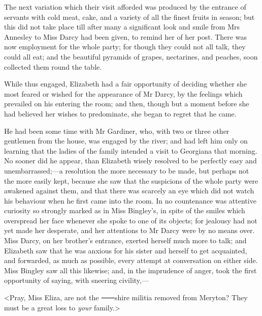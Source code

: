 The next variation which their visit afforded was produced by the entrance of servants with cold meat, cake, and a variety of all the finest fruits in season; but this did not take place till after many a significant look and smile from Mrs Annesley to Miss Darcy had been given, to remind her of her post. There was now employment for the whole party; for though they could not all talk, they could all eat; and the beautiful pyramids of grapes, nectarines, and peaches, soon collected them round the table.

While thus engaged, Elizabeth had a fair opportunity of deciding whether she most feared or wished for the appearance of Mr Darcy, by the feelings which prevailed on his entering the room; and then, though but a moment before she had believed her wishes to predominate, she began to regret that he came.

He had been some time with Mr Gardiner, who, with two or three other gentlemen from the house, was engaged by the river; and had left him only on learning that the ladies of the family intended a visit to Georgiana that morning. No sooner did he appear, than Elizabeth wisely resolved to be perfectly easy and unembarrassed;—a resolution the more necessary to be made, but perhaps not the more easily kept, because she saw that the suspicions of the whole party were awakened against them, and that there was scarcely an eye which did not watch his behaviour when he first came into the room. In no countenance was attentive curiosity so strongly marked as in Miss Bingley's, in spite of the smiles which overspread her face whenever she spoke to one of its objects; for jealousy had not yet made her desperate, and her attentions to Mr Darcy were by no means over. Miss Darcy, on her brother's entrance, exerted herself much more to talk; and Elizabeth saw that he was anxious for his sister and herself to get acquainted, and forwarded, as much as possible, every attempt at conversation on either side. Miss Bingley saw all this likewise; and, in the imprudence of anger, took the first opportunity of saying, with sneering civility,—

<Pray, Miss Eliza, are not the ⸺shire militia removed from Meryton? They must be a great loss to \textit{your} family.>

